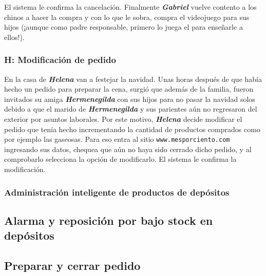 El sistema le confirma la cancelación. Finalmente \textbf{\emph{Gabriel}} vuelve
contento a los chinos a hacer la compra y con lo que le sobra, compra el
videojuego para sus hijos (¡aunque como padre responsable, primero lo juega el
para enseñarle a ellos!).

\subsubsection{H: Modificación de pedido}

En la casa de \textbf{\emph{Helena}} van a festejar la navidad. Unas horas
después de que había hecho un pedido para preparar la cena, surgió que además de
la familia, fueron invitados su amiga \textbf{\emph{Hermenegilda}} con sus hijos
para no pasar la navidad solos debido a que el marido de
\textbf{\emph{Hermenegilda}} y sus parientes aún no regresaron del exterior por
asuntos laborales. Por este motivo, \textbf{\emph{Helena}} decide modificar el
pedido que tenía hecho incrementando la cantidad de productos comprados como por
ejemplo las gaseosas. Para eso entra al sitio \texttt{www.mesporciento.com}
ingresando sus datos, chequea que aún no haya sido cerrado dicho pedido, y al
comprobarlo selecciona la opción de modificarlo. El sistema le confirma la
modificación.

\subsubsection{Administración inteligente de productos de depósitos}


\subsection{Alarma y reposición por bajo stock en depósitos}


\subsection{Preparar y cerrar pedido}

